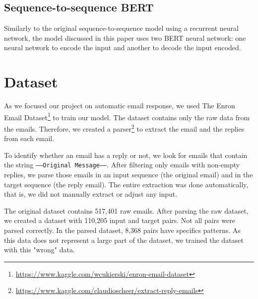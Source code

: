 \documentclass[letterpaper]{article}
\begin{document}
\subsection{Sequence-to-sequence BERT}

Similarly to the original sequence-to-sequence model using a recurrent neural network, the model discussed in this paper uses two BERT neural network: one neural network to encode the input and another to decode the input encoded. 


\section{Dataset}

As we focused our project on automatic email response, we used The Enron Email Dataset\footnote{\href{https://www.kaggle.com/wcukierski/enron-email-dataset}{https://www.kaggle.com/wcukierski/enron-email-dataset}} to train our model. The dataset contains only the raw data from the emails. Therefore, we created a parser\footnote{\href{https://www.kaggle.com/claudioscheer/extract-reply-emails}{https://www.kaggle.com/claudioscheer/extract-reply-emails}} to extract the email and the replies from each email.

To identify whether an email has a reply or not, we look for emails that contain the string \texttt{-----Original Message-----}. After filtering only emails with non-empty replies, we parse those emails in an input sequence (the original email) and in the target sequence (the reply email). The entire extraction was done automatically, that is, we did not manually extract or adjust any input.

The original dataset contains 517,401 raw emails. After parsing the raw dataset, we created a dataset with 110,205 input and target pairs. Not all pairs were parsed correctly. In the parsed dataset, 8,368 pairs have specifics patterns. As this data does not represent a large part of the dataset, we trained the dataset with this "wrong" data.




\end{document}
